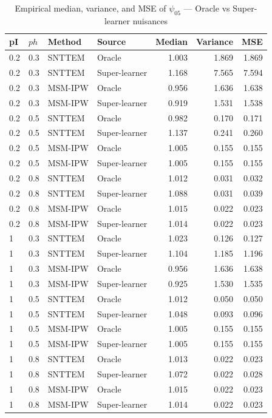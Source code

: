 \documentclass{article}
\begin{document}
\begin{table}[ht]
\centering
\caption{Empirical median, variance, and MSE of $\psi_{05}$ --- Oracle vs Super-learner nuisances}
\begin{tabular}{ll l l r r r}
\toprule
pI & $ph$ & Method & Source & Median & Variance & MSE \\
\midrule
0.2 & 0.3 & SNTTEM & Oracle & 1.003 & 1.869 & 1.869 \\
0.2 & 0.3 & SNTTEM & Super-learner & 1.168 & 7.565 & 7.594 \\
0.2 & 0.3 & MSM-IPW & Oracle & 0.956 & 1.636 & 1.638 \\
0.2 & 0.3 & MSM-IPW & Super-learner & 0.919 & 1.531 & 1.538 \\
0.2 & 0.5 & SNTTEM & Oracle & 0.982 & 0.170 & 0.171 \\
0.2 & 0.5 & SNTTEM & Super-learner & 1.137 & 0.241 & 0.260 \\
0.2 & 0.5 & MSM-IPW & Oracle & 1.005 & 0.155 & 0.155 \\
0.2 & 0.5 & MSM-IPW & Super-learner & 1.005 & 0.155 & 0.155 \\
0.2 & 0.8 & SNTTEM & Oracle & 1.012 & 0.031 & 0.032 \\
0.2 & 0.8 & SNTTEM & Super-learner & 1.088 & 0.031 & 0.039 \\
0.2 & 0.8 & MSM-IPW & Oracle & 1.015 & 0.022 & 0.023 \\
0.2 & 0.8 & MSM-IPW & Super-learner & 1.014 & 0.022 & 0.023 \\
1 & 0.3 & SNTTEM & Oracle & 1.023 & 0.126 & 0.127 \\
1 & 0.3 & SNTTEM & Super-learner & 1.104 & 1.185 & 1.196 \\
1 & 0.3 & MSM-IPW & Oracle & 0.956 & 1.636 & 1.638 \\
1 & 0.3 & MSM-IPW & Super-learner & 0.925 & 1.530 & 1.535 \\
1 & 0.5 & SNTTEM & Oracle & 1.012 & 0.050 & 0.050 \\
1 & 0.5 & SNTTEM & Super-learner & 1.048 & 0.093 & 0.096 \\
1 & 0.5 & MSM-IPW & Oracle & 1.005 & 0.155 & 0.155 \\
1 & 0.5 & MSM-IPW & Super-learner & 1.005 & 0.155 & 0.155 \\
1 & 0.8 & SNTTEM & Oracle & 1.013 & 0.022 & 0.023 \\
1 & 0.8 & SNTTEM & Super-learner & 1.072 & 0.022 & 0.028 \\
1 & 0.8 & MSM-IPW & Oracle & 1.015 & 0.022 & 0.023 \\
1 & 0.8 & MSM-IPW & Super-learner & 1.014 & 0.022 & 0.023 \\
\bottomrule
\end{tabular}
\end{table}
\end{document}
